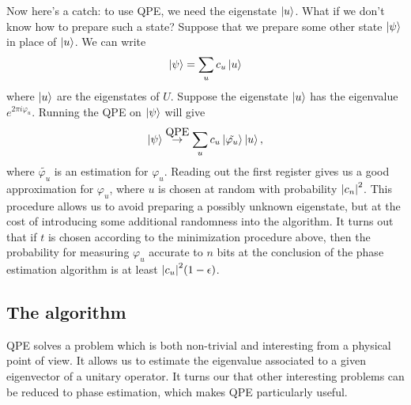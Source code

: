 \documentclass{book}
\theoremstyle{definition}
\begin{document}
Now here's a catch: to use QPE, we need the eigenstate $\ket{u}$. What if we don't know how to prepare such a state? Suppose that we prepare some other state $\ket{\psi}$ in place of $\ket{u}$. We can write
\begin{align}
\ket{\psi} = \sum_u c_u \ket{u}
\end{align}
where $\ket{u}$ are the eigenstates of $U$. Suppose the eigenstate $\ket{u}$ has the eigenvalue $e^{2\pi i \varphi_u}$. Running the QPE on $\ket{\psi}$ will give
\begin{align}
\ket{\psi} \stackrel{\mbox{QPE}}{\to} \sum_u c_u \ket{\tilde{\varphi_u}}\ket{u},
\end{align}
where $\tilde{\varphi_u}$ is an estimation for $\varphi_u$. Reading out the first register gives us a good approximation for $\varphi_u$, where $u$ is chosen at random with probability $\abs{c_n}^2$. This procedure allows us to avoid preparing a possibly unknown eigenstate, but at the cost of introducing some additional randomness into the algorithm. It turns out that if $t$ is chosen according to the minimization procedure above, then the probability for measuring $\varphi_u$ accurate to $n$ bits at the conclusion of the phase estimation algorithm is at least $\abs{c_u}^2(1-\epsilon)$.







\subsection{The algorithm}
QPE solves a problem which is both non-trivial and interesting from a physical point of view. It allows us to estimate the eigenvalue associated to a given eigenvector of a unitary operator. It turns our that other interesting problems can be reduced to phase estimation, which makes QPE particularly useful.\\
\end{document}
